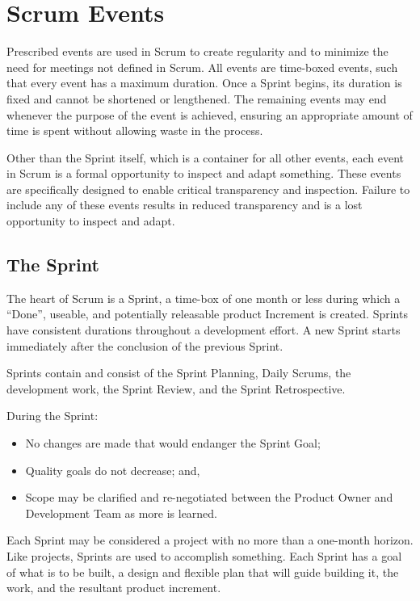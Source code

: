 \section{Scrum Events}
Prescribed events are used in Scrum to create regularity and to minimize the need for meetings
not defined in Scrum. All events are time-boxed events, such that every event has a maximum
duration. Once a Sprint begins, its duration is fixed and cannot be shortened or lengthened. The
remaining events may end whenever the purpose of the event is achieved, ensuring an
appropriate amount of time is spent without allowing waste in the process.

Other than the Sprint itself, which is a container for all other events, each event in Scrum is a
formal opportunity to inspect and adapt something. These events are specifically designed to
enable critical transparency and inspection. Failure to include any of these events results in
reduced transparency and is a lost opportunity to inspect and adapt.

\subsection{The Sprint}
The heart of Scrum is a Sprint, a time-box of one month or less during which a ``Done'', useable,
and potentially releasable product Increment is created. Sprints have consistent durations
throughout a development effort. A new Sprint starts immediately after the conclusion of the
previous Sprint.

Sprints contain and consist of the Sprint Planning, Daily Scrums, the development work, the
Sprint Review, and the Sprint Retrospective.

During the Sprint:
\begin{itemize}
\item No changes are made that would endanger the Sprint Goal;
\item Quality goals do not decrease; and,
\item Scope may be clarified and re-negotiated between the Product Owner and Development
      Team as more is learned.
\end{itemize}
Each Sprint may be considered a project with no more than a one-month horizon. Like projects,
Sprints are used to accomplish something. Each Sprint has a goal of what is to be built, a design
and flexible plan that will guide building it, the work, and the resultant product increment.

